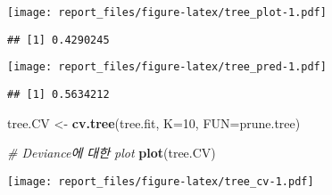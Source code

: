 \documentclass[]{article}
\newenvironment{Shaded}{\begin{snugshade}}{\end{snugshade}}
\newcommand{\CommentTok}[1]{\textcolor[rgb]{0.56,0.35,0.01}{\textit{#1}}}
\newcommand{\DataTypeTok}[1]{\textcolor[rgb]{0.13,0.29,0.53}{#1}}
\newcommand{\DecValTok}[1]{\textcolor[rgb]{0.00,0.00,0.81}{#1}}
\newcommand{\KeywordTok}[1]{\textcolor[rgb]{0.13,0.29,0.53}{\textbf{#1}}}
\newcommand{\NormalTok}[1]{#1}
\newcommand{\OperatorTok}[1]{\textcolor[rgb]{0.81,0.36,0.00}{\textbf{#1}}}
\newcommand{\StringTok}[1]{\textcolor[rgb]{0.31,0.60,0.02}{#1}}
\begin{document}
\texttt{[image: report\_files/figure-latex/tree\_plot-1.pdf]}

\begin{Shaded}
\end{Shaded}

\begin{verbatim}
## [1] 0.4290245
\end{verbatim}

\begin{Shaded}
\end{Shaded}

\texttt{[image: report\_files/figure-latex/tree\_pred-1.pdf]}

\begin{Shaded}
\end{Shaded}

\begin{verbatim}
## [1] 0.5634212
\end{verbatim}

\begin{Shaded}
\begin{Highlighting}[]
\NormalTok{tree.CV <-}\StringTok{ }\KeywordTok{cv.tree}\NormalTok{(tree.fit, }\DataTypeTok{K=}\DecValTok{10}\NormalTok{, }\DataTypeTok{FUN=}\NormalTok{prune.tree)}

\CommentTok{# Deviance에 대한 plot}
\KeywordTok{plot}\NormalTok{(tree.CV)}
\end{Highlighting}
\end{Shaded}

\texttt{[image: report\_files/figure-latex/tree\_cv-1.pdf]}
\end{document}
